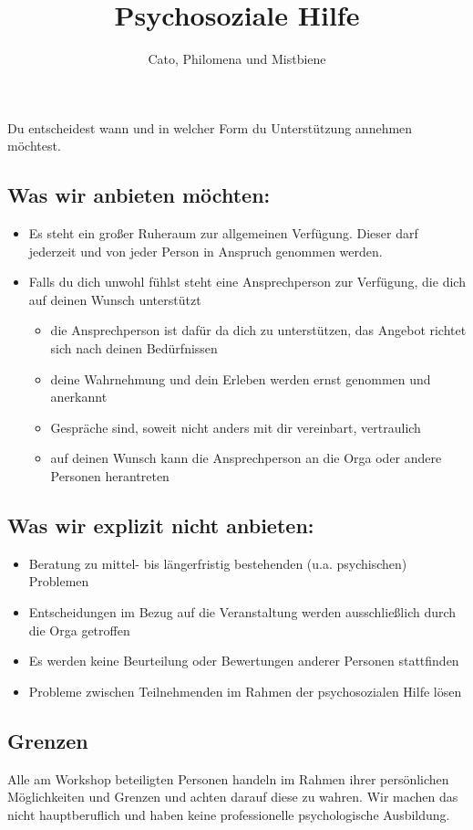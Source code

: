 \documentclass{article}
\title{Psychosoziale Hilfe}
\author{Cato, Philomena und Mistbiene}
\begin{document}
Du entscheidest wann und in welcher Form du Unterstützung annehmen möchtest.
\\
\subsection*{Was wir anbieten möchten:}
\begin{itemize}
    \item Es steht ein großer Ruheraum zur allgemeinen Verfügung. Dieser darf jederzeit und von jeder Person in Anspruch genommen werden.
    \item Falls du dich unwohl fühlst steht eine Ansprechperson zur Verfügung, die dich auf deinen Wunsch unterstützt
    \begin{itemize}
        \item die Ansprechperson ist dafür da dich zu unterstützen, das Angebot richtet sich nach deinen Bedürfnissen
        \item deine Wahrnehmung und dein Erleben werden ernst genommen und anerkannt
        \item Gespräche sind, soweit nicht anders mit dir vereinbart, vertraulich
        \item auf deinen Wunsch kann die Ansprechperson an die Orga oder andere Personen herantreten
    \end{itemize}
\end{itemize}

\subsection*{Was wir explizit nicht anbieten:}
\begin{itemize}
    \item Beratung zu mittel- bis längerfristig bestehenden (u.a. psychischen) Problemen
    \item Entscheidungen im Bezug auf die Veranstaltung werden ausschließlich durch die Orga getroffen
    \item Es werden keine Beurteilung oder Bewertungen anderer Personen stattfinden
    \item Probleme zwischen Teilnehmenden im Rahmen der psychosozialen Hilfe lösen
\end{itemize}
\subsection*{Grenzen}
Alle am Workshop beteiligten Personen handeln im Rahmen ihrer persönlichen Möglichkeiten und Grenzen und achten darauf diese zu wahren. Wir machen das nicht hauptberuflich und haben keine professionelle psychologische Ausbildung.
\end{document}
